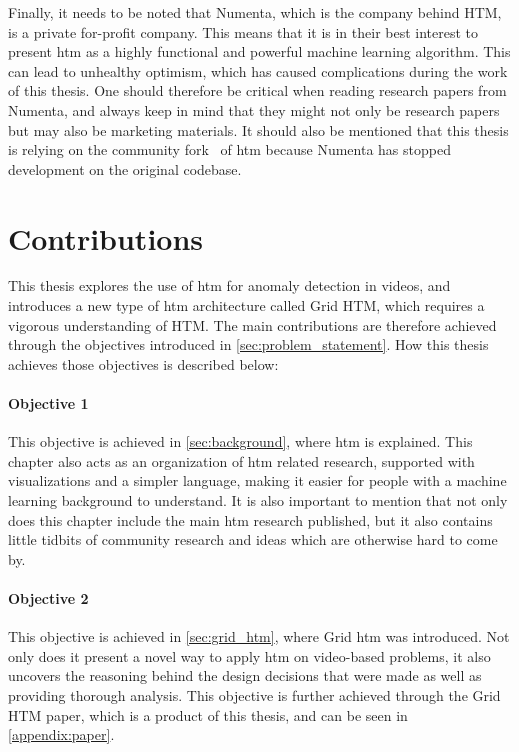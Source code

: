 \par
Finally, it needs to be noted that Numenta, which is the company behind HTM, is a private for-profit company. This means that it is in their best interest to present \gls*{htm} as a highly functional and powerful machine learning algorithm. This can lead to unhealthy optimism, which has caused complications during the work of this thesis. One should therefore be critical when reading research papers from Numenta, and always keep in mind that they might not only be research papers but may also be marketing materials. It should also be mentioned that this thesis is relying on the community fork~\cite{htm_community_fork} of \gls*{htm} because Numenta has stopped development on the original codebase.

\section{Contributions}
This thesis explores the use of \gls*{htm} for anomaly detection in videos, and introduces a new type of \gls*{htm} architecture called Grid HTM, which requires a vigorous understanding of HTM. The main contributions are therefore achieved through the objectives introduced in \autoref{sec:problem_statement}. How this thesis achieves those objectives is described below:
\paragraph*{Objective 1} \emph{}
\par
This objective is achieved in \autoref{sec:background}, where \gls*{htm} is explained. This chapter also acts as an organization of  \gls*{htm} related research, supported with visualizations and a simpler language, making it easier for people with a machine learning background to understand. It is also important to mention that not only does this chapter include the main \gls*{htm} research published, but it also contains little tidbits of community research and ideas which are otherwise hard to come by.
\paragraph*{Objective 2} \emph{}
\par
This objective is achieved in \autoref{sec:grid_htm}, where Grid \gls*{htm} was introduced. Not only does it present a novel way to apply  \gls*{htm} on video-based problems, it also uncovers the reasoning behind the design decisions that were made as well as providing thorough analysis. This objective is further achieved through the Grid HTM paper, which is a product of this thesis, and can be seen in \autoref{appendix:paper}.
